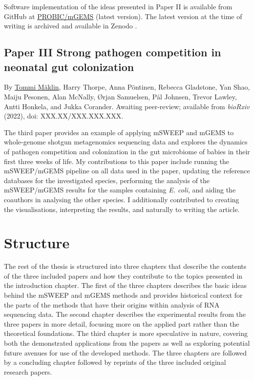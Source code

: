 \documentclass[officiallayout]{tktla}
\begin{document}
Software implementation of the ideas presented in Paper II is
available from GitHub at
\href{https://github.com/PROBIC/mGEMS}{PROBIC/mGEMS} (latest version).
The latest version at the time of writing is archived and available in
Zenodo \citep{maklin_mGEMS}.

\subsection*{Paper III \textemdash Strong pathogen competition in neonatal gut colonization}
By \underline{Tommi Mäklin}, Harry Thorpe, Anna Pöntinen, Rebecca
Gladstone, Yan Shao, Maiju Pesonen, Alan McNally, Ørjan Samuelsen, Pål
Johnsen, Trevor Lawley, Antti Honkela, and Jukka Corander. Awaiting
peer-review; available from \textit{bioRxiv} (2022), doi:
XXX.XX/XXX.XXX.XXX.

The third paper \citep{maklin_strong_2022} provides an example of
applying mSWEEP and mGEMS to whole-genome shotgun metagenomics
sequencing data and explores the dynamics of pathogen competition and
colonization in the gut microbiome of babies in their first three
weeks of life. My contributions to this paper include running the
mSWEEP/mGEMS pipeline on all data used in the paper, updating the
reference databases for the investigated species, performing the
analysis of the mSWEEP/mGEMS results for the samples containing
\textit{E. coli}, and aiding the coauthors in analysing the other
species. I additionally contributed to creating the visualisations,
interpreting the results, and naturally to writing the article.

\section{Structure}

The rest of the thesis is structured into three chapters that describe
the contents of the three included papers and how they contribute to
the topics presented in the introduction chapter. The first of the
three chapters describes the basic ideas behind the mSWEEP and mGEMS
methods and provides historical context for the parts of the methods
that have their origins within analysis of RNA sequencing data. The
second chapter describes the experimental results from the three
papers in more detail, focusing more on the applied part rather than
the theoretical foundations. The third chapter is more speculative in
nature, covering both the demonstrated applications from the papers as
well as exploring potential future avenues for use of the developed
methods. The three chapters are followed by a concluding chapter
followed by reprints of the three included original research papers.
\end{document}
